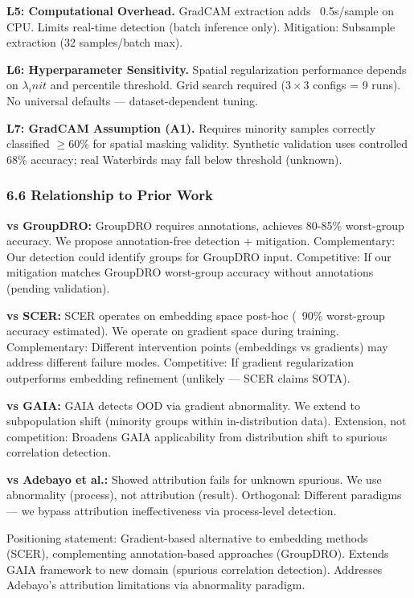 \textbf{L5: Computational Overhead.} GradCAM extraction adds ~0.5s/sample on CPU. Limits real-time detection (batch inference only). Mitigation: Subsample extraction (32 samples/batch max).

\textbf{L6: Hyperparameter Sensitivity.} Spatial regularization performance depends on $\lambda _init$ and percentile threshold. Grid search required ($3\times 3$ configs = 9 runs). No universal defaults --- dataset-dependent tuning.

\textbf{L7: GradCAM Assumption (A1).} Requires minority samples correctly classified $\geq 60$\% for spatial masking validity. Synthetic validation uses controlled 68\% accuracy; real Waterbirds may fall below threshold (unknown).

\subsubsection{6.6 Relationship to Prior Work}

\textbf{vs GroupDRO:} GroupDRO requires annotations, achieves 80-85\% worst-group accuracy. We propose annotation-free detection + mitigation. Complementary: Our detection could identify groups for GroupDRO input. Competitive: If our mitigation matches GroupDRO worst-group accuracy without annotations (pending validation).

\textbf{vs SCER:} SCER operates on embedding space post-hoc (~90\% worst-group accuracy estimated). We operate on gradient space during training. Complementary: Different intervention points (embeddings vs gradients) may address different failure modes. Competitive: If gradient regularization outperforms embedding refinement (unlikely --- SCER claims SOTA).

\textbf{vs GAIA:} GAIA detects OOD via gradient abnormality. We extend to subpopulation shift (minority groups within in-distribution data). Extension, not competition: Broadens GAIA applicability from distribution shift to spurious correlation detection.

\textbf{vs Adebayo et al.:} Showed attribution fails for unknown spurious. We use abnormality (process), not attribution (result). Orthogonal: Different paradigms --- we bypass attribution ineffectiveness via process-level detection.

Positioning statement: Gradient-based alternative to embedding methods (SCER), complementing annotation-based approaches (GroupDRO). Extends GAIA framework to new domain (spurious correlation detection). Addresses Adebayo's attribution limitations via abnormality paradigm.

